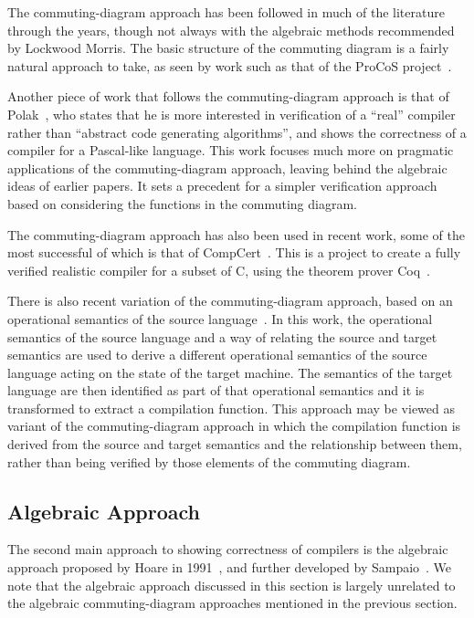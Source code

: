 The commuting-diagram approach has been followed in much of the
literature through the years, though not always with the algebraic
methods recommended by Lockwood Morris.
The basic structure of the commuting diagram is a fairly natural
approach to take, as seen by work such as that of the ProCoS
project~\cite{buth1992}.

Another piece of work that follows the commuting-diagram approach is
that of Polak~\cite{polak1981}, who states that he is more interested
in verification of a ``real'' compiler rather than ``abstract code
generating algorithms'', and shows the correctness of a compiler for a
Pascal-like language.
This work focuses much more on pragmatic applications of the
commuting-diagram approach, leaving behind the algebraic ideas of
earlier papers.
It sets a precedent for a simpler verification approach based on
considering the functions in the commuting diagram.

The commuting-diagram approach has also been used in recent work, some of the
most successful of which is that of CompCert~\cite{leroy2009a,
  leroy2009b, leroy2012}.
This is a project to create a fully verified realistic compiler for a
subset of C, using the theorem prover Coq~\cite{coq2004}.

There is also recent variation of the commuting-diagram approach, 
based on an operational semantics of the source
language~\cite{bahr2015}.
In this work, the operational semantics of the source language and
a way of relating the source and target semantics are used to derive a
different operational semantics of the source language acting on the
state of the target machine.
The semantics of the target language are then identified as part of
that operational semantics and it is transformed to extract a
compilation function.
This approach may be viewed as variant of the commuting-diagram
approach in which the compilation function is derived from the source
and target semantics and the relationship between them, rather than
being verified by those elements of the commuting diagram.

\subsection{Algebraic Approach}
\label{algebraic-approach-subsection}

The second main approach to showing correctness of compilers is the
algebraic approach proposed by Hoare in 1991~\cite{hoare1991}, and
further developed by Sampaio~\cite{hoare1993, sampaio1993,
  sampaio1997}.
We note that the algebraic approach discussed in this section is
largely unrelated to the algebraic commuting-diagram approaches
mentioned in the previous section.

